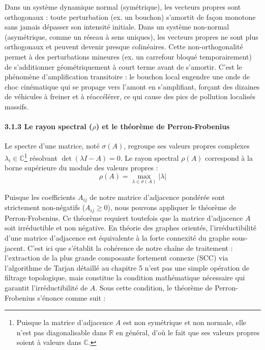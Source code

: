 \documentclass[10pt, a4paper]{article}
\begin{document}
Dans un système dynamique normal (symétrique), les vecteurs propres sont
orthogonaux : toute perturbation (ex. un bouchon) s'amortit de façon
monotone sans jamais dépasser son intensité initiale. Dans un système
non-normal (asymétrique, comme un réseau à sens uniques), les vecteurs
propres ne sont plus orthogonaux et peuvent devenir presque colinéaires.
Cette non-orthogonalité permet à des perturbations mineures (ex. un
carrefour bloqué temporairement) de s'additionner géométriquement à
court terme avant de s'amortir. C'est le phénomène d'amplification
transitoire : le bouchon local engendre une onde de choc cinématique qui
se propage vers l'amont en s'amplifiant, forçant des dizaines de
véhicules à freiner et à réaccélérer, ce qui cause des pics de pollution
localisés massifs.

\paragraph{\texorpdfstring{3.1.3 Le rayon spectral (\(\rho\)) et le
théorème de
Perron-Frobenius}{3.1.3 Le rayon spectral (\textbackslash rho) et le théorème de Perron-Frobenius}}\label{le-rayon-spectral-rho-et-le-thuxe9oruxe8me-de-perron-frobenius}

Le spectre d'une matrice, noté \(\sigma(A)\), regroupe ses valeurs
propres complexes
\(\lambda_i \in \mathbb{C}\)\footnote{Puisque la matrice d'adjacence $A$ est non symétrique et non normale, elle n'est pas diagonalisable dans $\mathbb{R}$ en général, d'où le fait que ses valeurs propres soient à valeurs dans $\mathbb{C}$.}
résolvant \(\det(\lambda I - A) = 0\). Le rayon spectral \(\rho(A)\)
correspond à la borne supérieure du module des valeurs propres :
\[\rho(A) = \max_{\lambda \in \sigma(A)} |\lambda|\]

Puisque les coefficients \(A_{ij}\) de notre matrice d'adjacence
pondérée sont strictement non-négatifs (\(A_{ij} \ge 0\)), nous pouvons
appliquer le théorème de Perron-Frobenius. Ce théorème requiert
toutefois que la matrice d'adjacence \(A\) soit irréductible et non
négative. En théorie des graphes orientés, l'irréductibilité d'une
matrice d'adjacence est équivalente à la forte connexité du graphe
sous-jacent. C'est ici que s'établit la cohérence de notre chaîne de
traitement : l'extraction de la plus grande composante fortement connexe
(SCC) via l'algorithme de Tarjan détaillé au chapitre 5 n'est pas une
simple opération de filtrage topologique, mais constitue la condition
mathématique nécessaire qui garantit l'irréductibilité de \(A\). Sous
cette condition, le théorème de Perron-Frobenius s'énonce comme suit :
\end{document}
